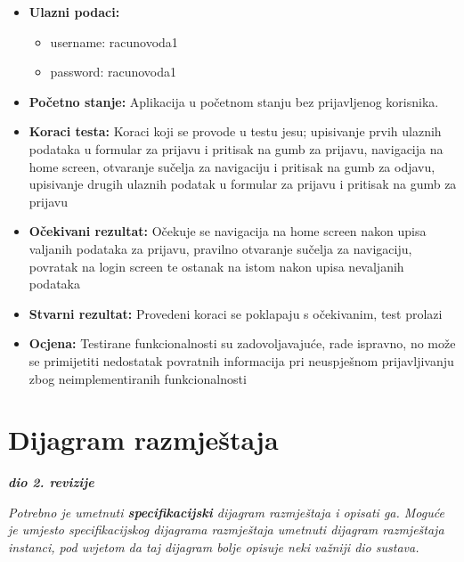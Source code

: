 			\begin{itemize}
				
				\item{\textbf{Ulazni podaci:}}
				\begin{itemize}
					\item{username: racunovoda1}
					\item{password: racunovoda1}
				\end{itemize}
				
				\item{\textbf{Početno stanje:} Aplikacija u početnom stanju bez prijavljenog korisnika.}
				
				\item{\textbf{Koraci testa:} Koraci koji se provode u testu jesu; upisivanje prvih ulaznih podataka u formular za prijavu i pritisak na gumb za prijavu, navigacija na home screen, otvaranje sučelja za navigaciju i pritisak na gumb za odjavu, upisivanje drugih ulaznih podatak u formular za prijavu i pritisak na gumb za prijavu}
				
				\item{\textbf{Očekivani rezultat:} Očekuje se navigacija na home screen nakon upisa valjanih podataka za prijavu, pravilno otvaranje sučelja za navigaciju, povratak na login screen te ostanak na istom nakon upisa nevaljanih podataka}
				
				\item{\textbf{Stvarni rezultat:} Provedeni koraci se poklapaju s očekivanim, test prolazi}
				
				\item{\textbf{Ocjena:} Testirane funkcionalnosti su zadovoljavajuće, rade ispravno, no može se primijetiti nedostatak povratnih informacija pri neuspješnom prijavljivanju zbog neimplementiranih funkcionalnosti}
				
			\end{itemize}
			 
			\eject 
		
		
		\section{Dijagram razmještaja}
			
			\textbf{\textit{dio 2. revizije}}
			
			 \textit{Potrebno je umetnuti \textbf{specifikacijski} dijagram razmještaja i opisati ga. Moguće je umjesto specifikacijskog dijagrama razmještaja umetnuti dijagram razmještaja instanci, pod uvjetom da taj dijagram bolje opisuje neki važniji dio sustava.}
			
